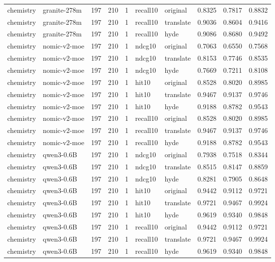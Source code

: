 \begin{tabular}{llrrrllrrr}
chemistry & granite-278m & 197 & 210 & 1 & recall10 & original & 0.8325 & 0.7817 & 0.8832 \\
chemistry & granite-278m & 197 & 210 & 1 & recall10 & translate & 0.9036 & 0.8604 & 0.9416 \\
chemistry & granite-278m & 197 & 210 & 1 & recall10 & hyde & 0.9086 & 0.8680 & 0.9492 \\
chemistry & nomic-v2-moe & 197 & 210 & 1 & ndcg10 & original & 0.7063 & 0.6550 & 0.7568 \\
chemistry & nomic-v2-moe & 197 & 210 & 1 & ndcg10 & translate & 0.8153 & 0.7746 & 0.8535 \\
chemistry & nomic-v2-moe & 197 & 210 & 1 & ndcg10 & hyde & 0.7669 & 0.7211 & 0.8108 \\
chemistry & nomic-v2-moe & 197 & 210 & 1 & hit10 & original & 0.8528 & 0.8020 & 0.8985 \\
chemistry & nomic-v2-moe & 197 & 210 & 1 & hit10 & translate & 0.9467 & 0.9137 & 0.9746 \\
chemistry & nomic-v2-moe & 197 & 210 & 1 & hit10 & hyde & 0.9188 & 0.8782 & 0.9543 \\
chemistry & nomic-v2-moe & 197 & 210 & 1 & recall10 & original & 0.8528 & 0.8020 & 0.8985 \\
chemistry & nomic-v2-moe & 197 & 210 & 1 & recall10 & translate & 0.9467 & 0.9137 & 0.9746 \\
chemistry & nomic-v2-moe & 197 & 210 & 1 & recall10 & hyde & 0.9188 & 0.8782 & 0.9543 \\
chemistry & qwen3-0.6B & 197 & 210 & 1 & ndcg10 & original & 0.7938 & 0.7518 & 0.8344 \\
chemistry & qwen3-0.6B & 197 & 210 & 1 & ndcg10 & translate & 0.8515 & 0.8147 & 0.8859 \\
chemistry & qwen3-0.6B & 197 & 210 & 1 & ndcg10 & hyde & 0.8281 & 0.7905 & 0.8648 \\
chemistry & qwen3-0.6B & 197 & 210 & 1 & hit10 & original & 0.9442 & 0.9112 & 0.9721 \\
chemistry & qwen3-0.6B & 197 & 210 & 1 & hit10 & translate & 0.9721 & 0.9467 & 0.9924 \\
chemistry & qwen3-0.6B & 197 & 210 & 1 & hit10 & hyde & 0.9619 & 0.9340 & 0.9848 \\
chemistry & qwen3-0.6B & 197 & 210 & 1 & recall10 & original & 0.9442 & 0.9112 & 0.9721 \\
chemistry & qwen3-0.6B & 197 & 210 & 1 & recall10 & translate & 0.9721 & 0.9467 & 0.9924 \\
chemistry & qwen3-0.6B & 197 & 210 & 1 & recall10 & hyde & 0.9619 & 0.9340 & 0.9848 \\

\end{tabular}
